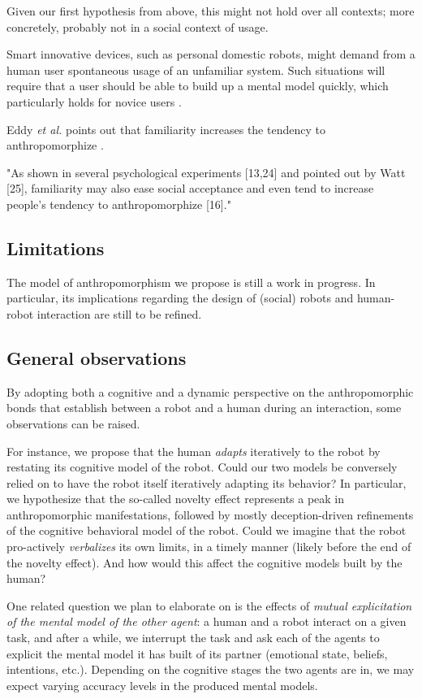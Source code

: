 \documentclass{frontiersSCNS} %
\begin{document}
Given our first hypothesis from above, this might not hold over all contexts;
more concretely, probably not in a social context of usage.


Smart innovative devices, such as personal domestic robots, might demand from a
human user spontaneous usage of an unfamiliar system. Such situations will
require that a user should be able to build up a mental model quickly, which
particularly holds for novice users \cite{schmitz_concepts_2011}.

Eddy \textit{et al.} points out that familiarity increases the tendency to
anthropomorphize \cite{eddy_attribution_1993}.

"As shown in several psychological experiments [13,24] and pointed out by Watt
[25], familiarity may also ease social acceptance and even tend to increase
people's tendency to anthropomorphize [16]." \cite{duffy_anthropomorphism_2003}


\subsection{Limitations}

The model of anthropomorphism we propose is still a work in progress. In
particular, its implications regarding the design of (social) robots and
human-robot interaction are still to be refined.

\subsection{General observations}

By adopting both a cognitive and a dynamic perspective on the anthropomorphic
bonds that establish between a robot and a human during an interaction, some
observations can be raised.

For instance, we propose that the human \emph{adapts} iteratively to the robot
by restating its cognitive model of the robot. Could our two models be
conversely relied on to have the robot itself iteratively adapting its
behavior? In particular, we hypothesize that the so-called novelty effect
represents a peak in anthropomorphic manifestations, followed by mostly
deception-driven refinements of the cognitive behavioral model of the robot.
Could we imagine that the robot pro-actively \emph{verbalizes} its own limits,
in a timely manner (likely before the end of the novelty effect). And how would
this affect the cognitive models built by the human?

One related question we plan to elaborate on is the effects of \emph{mutual
explicitation of the mental model of the other agent}: a human and a robot
interact on a given task, and after a while, we interrupt the task and ask each
of the agents to explicit the mental model it has built of its partner
(emotional state, beliefs, intentions, etc.). Depending on the cognitive stages
the two agents are in, we may expect varying accuracy levels in the produced
mental models.
\end{document}

